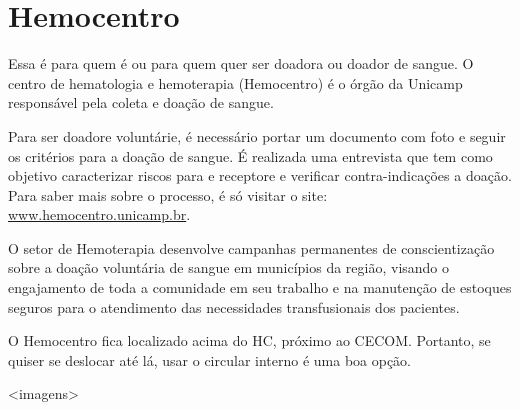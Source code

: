 \section{Hemocentro}

Essa é para quem é ou para quem quer ser doadora ou doador de sangue. O centro de
hematologia e hemoterapia (Hemocentro) é o órgão da Unicamp responsável pela coleta
e doação de sangue.

Para ser doadore voluntárie, é necessário portar um documento com foto e seguir os critérios para a doação de sangue. É realizada uma entrevista que tem como objetivo
caracterizar riscos para e receptore e verificar contra-indicações a doação. Para saber
mais sobre o processo, é só visitar o site: \url{www.hemocentro.unicamp.br}.

O setor de Hemoterapia desenvolve campanhas permanentes de conscientização
sobre a doação voluntária de sangue em municípios da região, visando o engajamento
de toda a comunidade em seu trabalho e na manutenção de estoques seguros para o
atendimento das necessidades transfusionais dos pacientes.

O Hemocentro fica localizado acima do HC, próximo ao CECOM. Portanto, se quiser se
deslocar até lá, usar o circular interno é uma boa opção.

<imagens>
